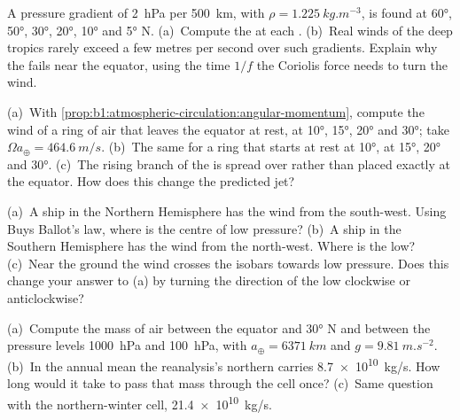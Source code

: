 \begin{exercise}[$\star\star$]\label{exo:b1:atmospheric-circulation:5}
A pressure gradient of \qty{2}{hPa} per \qty{500}{km}, with $\rho =
\qty{1.225}{kg.m^{-3}}$, is found at \ang{60}, \ang{50}, \ang{30}, \ang{20},
\ang{10} and \ang{5} N. (a)~Compute the  at each .
(b)~Real winds of the deep tropics rarely exceed a few metres per second over such
gradients. Explain why the  fails near the equator, using the
time $1/f$ the Coriolis force needs to turn the wind.
\end{exercise}

\begin{exercise}[$\star\star$]\label{exo:b1:atmospheric-circulation:6}
(a)~With \cref{prop:b1:atmospheric-circulation:angular-momentum}, compute the wind
of a ring of air that leaves the equator at rest, at \ang{10}, \ang{15}, \ang{20} and
\ang{30}; take $\Omega a_\oplus = \qty{464.6}{m/s}$. (b)~The same for a ring that
starts at rest at \ang{10}, at \ang{15}, \ang{20} and \ang{30}. (c)~The rising branch
of the  is spread over  rather than placed exactly at the equator.
How does this change the predicted jet?
\end{exercise}

\begin{exercise}[$\star\star$]\label{exo:b1:atmospheric-circulation:7}
(a)~A ship in the Northern Hemisphere has the wind from the south-west. Using Buys
Ballot's law, where is the centre of low pressure? (b)~A ship in the Southern
Hemisphere has the wind from the north-west. Where is the low? (c)~Near the ground the
wind crosses the isobars towards low pressure. Does this change your answer to (a)
by turning the direction of the low clockwise or anticlockwise?
\end{exercise}

\begin{exercise}[$\star\star$]\label{exo:b1:atmospheric-circulation:8}
(a)~Compute the mass of air between the equator and \ang{30} N and between the
pressure levels \qty{1000}{hPa} and \qty{100}{hPa}, with $a_\oplus = \qty{6371}{km}$
and $g = \qty{9.81}{m.s^{-2}}$. (b)~In the annual mean the reanalysis's northern
 carries \qty{8.7e10}{kg/s}. How long would it take to pass that mass
through the cell once? (c)~Same question with the northern-winter cell,
\qty{21.4e10}{kg/s}.
\end{exercise}

